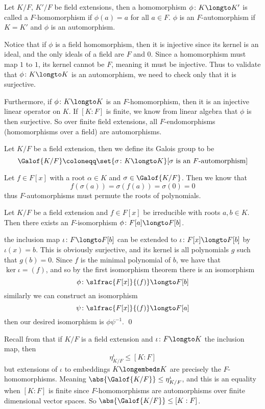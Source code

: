 \bdefn

    Let $K/F$, $K'/F$ be field extensions, then a homomorphism $\phi\colon K\longto K'$ is called a {\emphcolor $F$-homomorphism} if $\phi(a)=a$ for all $a\in F$.
    $\phi$ is an {\emphcolor $F$-automorphism} if $K=K'$ and $\phi$ is an automorphism.

\edefn

Notice that if $\phi$ is a field homomorphism, then it is injective since its kernel is an ideal, and the only ideals of a field are $F$ and $0$.
Since a homomorphism must map $1$ to $1$, its kernel cannot be $F$, meaning it must be injective.
Thus to validate that $\phi\colon K\longto K$ is an automorphism, we need to check only that it is surjective. 

Furthermore, if $\phi\colon K\longto K$ is an $F$-homomorphism, then it is an injective linear operator on $K$.
If $[K:F]$ is finite, we know from linear algebra that $\phi$ is then surjective.
So over finite field extensions, all $F$-endomorphisms (homomorphisms over a field) are automorphisms.

\bdefn

    Let $K/F$ be a field extension, then we define its {\emphcolor Galois group} to be
    $$ \Galof{K/F} \coloneqq \set{\sigma\colon K\longto K}[\hbox{$\sigma$ is an $F$-automorphism}] $$

\edefn

Let $f\in F[x]$ with a root $\alpha\in K$ and $\sigma\in\Galof{K/F}$.
Then we know that
$$ f(\sigma(a)) = \sigma(f(a)) = \sigma(0) = 0 $$
thus $F$-automorphisms must permute the roots of polynomials.

\bprop

    Let $K/F$ be a field extension and $f\in F[x]$ be irreducible with roots $a,b\in K$.
    Then there exists an $F$-isomorphism $\phi\colon F[a]\longto F[b]$.

\eprop

\Proof the inclusion map $\iota\colon F\longto F[b]$ can be extended to $\iota\colon F[x]\longto F[b]$ by $\iota(x)=b$.
This is obviously surjective, and its kernel is all polynomials $g$ such that $g(b)=0$.
Since $f$ is the minimal polynomial of $b$, we have that $\ker\iota=(f)$, and so by the first isomorphism theorem there is an isomorphism
$$ \phi\colon\slfrac{F[x]}{(f)} \longto F[b] $$
similarly we can construct an isomorphism
$$ \psi\colon\slfrac{F[x]}{(f)} \longto F[a] $$
then our desired isomorphism is $\phi\psi^{-1}$.
\qed

Recall from  that if $K/F$ is a field extension and $\iota\colon F\longto K$ the inclusion map, then
$$ \eta^\iota_{K/F} \leq [K:F] $$
but extensions of $\iota$ to embeddings $K\longembeds K$ are precisely the $F$-homomorphisms.
Meaning $\abs{\Galof{K/F}}\leq\eta^\iota_{K/F}$, and this is an equality when $[K:F]$ is finite since $F$-homomorphisms are automorphisms over finite dimensional vector spaces.
So $\abs{\Galof{K/F}}\leq[K:F]$.

